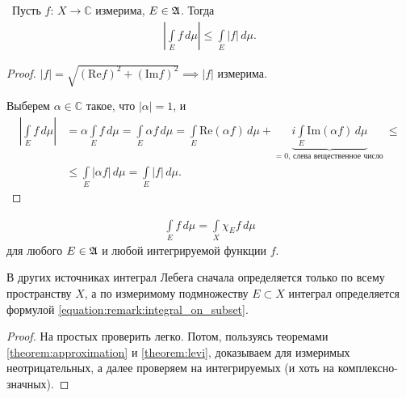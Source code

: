 \begin{claim}\
 Пусть $f \colon\, X \to \mathbb{C} $ измерима, $E \in \mathfrak{A}$. Тогда \begin{align*}
  \left| \int\limits_E f \, d\mu \right| \leqslant \int\limits_E \left| f \right| \,d\mu
 .\end{align*} 
\end{claim}
\begin{proof}
 $\left| f \right| = \sqrt{(\mathrm{Re} f)^{2} + (\mathrm{Im} f)^{2}} \implies \left| f \right| $ измерима.

 Выберем $\alpha \in \mathbb{C}$ такое, что $\left| \alpha \right| = 1$, и \begin{align*}
  \left| \int\limits_E f\,d\mu \right| &= \alpha \int\limits_E f\,d\mu = \int\limits_E \alpha f \,d\mu = \int\limits_E \mathrm{Re}(\alpha f) \,d\mu + \underbrace{i \int\limits_E \mathrm{Im}(\alpha f) \, d\mu}_{= 0 \text{, слева вещественное число }} \leqslant \\
  &\leqslant \int\limits_E \left| \alpha f \right| \,d\mu = \int\limits_E \left| f \right| \,d\mu
 .\end{align*} 
\end{proof}
\begin{remrk}
 \begin{align}
  \label{equation:remark:integral_on_subset}
  \int\limits_E f\,d\mu = \int\limits_X \chi_E f \,d\mu
 \end{align} для любого $E \in \mathfrak{A}$ и любой интегрируемой функции $f$.

 В других источниках интеграл Лебега сначала определяется только по всему пространству $X$, а по измеримому подмножеству $E \subset X$ интеграл определяется формулой \eqref{equation:remark:integral_on_subset}.
\end{remrk}
\begin{proof}
 На простых проверить легко. Потом, пользуясь теоремами \ref{theorem:approximation} и \ref{theorem:levi}, доказываем для измеримых неотрицательных, а далее проверяем на интегрируемых (и хоть на комплексно-значных).
\end{proof}


